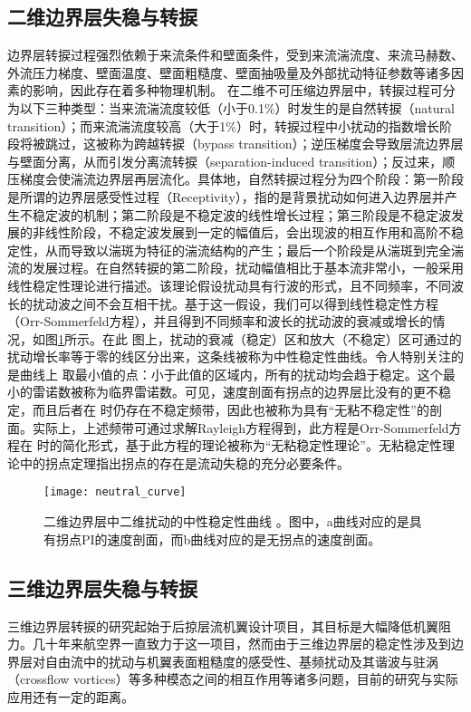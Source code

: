 \subsection{二维边界层失稳与转捩}
边界层转捩过程强烈依赖于来流条件和壁面条件，受到来流湍流度、来流马赫数、外流压力梯度、壁面温度、壁面粗糙度、壁面抽吸量及外部扰动特征参数等诸多因素的影响\cite{morkovin1969many}，因此存在着多种物理机制。
在二维不可压缩边界层中，转捩过程可分为以下三种类型：当来流湍流度较低（小于0.1\%）时发生的是自然转捩（natural transition）\cite{papanastasiou1999viscous}；而来流湍流度较高（大于1\%）时，转捩过程中小扰动的指数增长阶段将被跳过，这被称为跨越转捩（bypass transition）\cite{jacobs2001simulations}；逆压梯度会导致层流边界层与壁面分离，从而引发分离流转捩（separation-induced transition）\cite{malkiel1995transition}；反过来，顺压梯度会使湍流边界层再层流化\cite{walker1992role}。具体地，自然转捩过程分为四个阶段\cite{bradshaw1994turbulence}：第一阶段是所谓的边界层感受性过程（Receptivity）\cite{reshotko1984environment}，指的是背景扰动如何进入边界层并产生不稳定波的机制；第二阶段是不稳定波的线性增长过程；第三阶段是不稳定波发展的非线性阶段，不稳定波发展到一定的幅值后，会出现波的相互作用和高阶不稳定性，从而导致以湍斑为特征的湍流结构的产生；最后一个阶段是从湍斑到完全湍流的发展过程。在自然转捩的第二阶段，扰动幅值相比于基本流非常小，一般采用线性稳定性理论进行描述。该理论假设扰动具有行波的形式，且不同频率，不同波长的扰动波之间不会互相干扰。基于这一假设，我们可以得到线性稳定性方程（Orr-Sommerfeld方程），并且得到不同频率和波长的扰动波的衰减或增长的情况，如图\ref{f:neutral_curve}所示。在此 图上，扰动的衰减（稳定）区和放大（不稳定）区可通过的扰动增长率等于零的线区分出来，这条线被称为中性稳定性曲线。令人特别关注的是曲线上 取最小值的点：小于此值的区域内，所有的扰动均会趋于稳定。这个最小的雷诺数被称为临界雷诺数。可见，速度剖面有拐点的边界层比没有的更不稳定，而且后者在 时仍存在不稳定频带，因此也被称为具有“无粘不稳定性”的剖面。实际上，上述频带可通过求解Rayleigh方程\cite{Schlichting1979}得到，此方程是Orr-Sommerfeld方程在 时的简化形式，基于此方程的理论被称为“无粘稳定性理论”。无粘稳定性理论中的拐点定理指出拐点的存在是流动失稳的充分必要条件。
\begin{figure}
  \centering
  \texttt{[image: neutral\_curve]}
  \caption{二维边界层中二维扰动的中性稳定性曲线\cite{Schlichting1979}
  。图中，a曲线对应的是具有拐点PI的速度剖面，而b曲线对应的是无拐点的速度剖面。}\label{f:neutral_curve}
\end{figure}

\subsection{三维边界层失稳与转捩}
三维边界层转捩的研究起始于后掠层流机翼设计项目\cite{Gray1952}，其目标是大幅降低机翼阻力。几十年来航空界一直致力于这一项目，然而由于三维边界层的稳定性涉及到边界层对自由流中的扰动与机翼表面粗糙度的感受性、基频扰动及其谐波与驻涡（crossflow vortices）等多种模态之间的相互作用等诸多问题，目前的研究与实际应用还有一定的距离。

